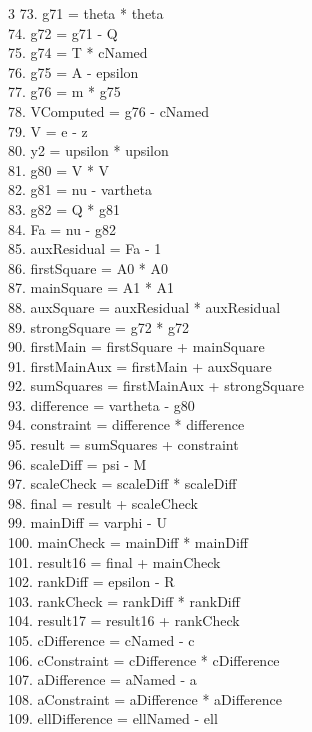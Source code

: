\documentclass[10pt]{article}
\begin{document}
\begin{multicols}{3}
73. g71 = theta * theta\\
74. g72 = g71 - Q\\
75. g74 = T * cNamed\\
76. g75 = A - epsilon\\
77. g76 = m * g75\\
78. VComputed = g76 - cNamed\\
79. V = e - z\\
80. y2 = upsilon * upsilon\\
81. g80 = V * V\\
82. g81 = nu - vartheta\\
83. g82 = Q * g81\\
84. Fa = nu - g82\\
85. auxResidual = Fa - 1\\
86. firstSquare = A0 * A0\\
87. mainSquare = A1 * A1\\
88. auxSquare = auxResidual * auxResidual\\
89. strongSquare = g72 * g72\\
90. firstMain = firstSquare + mainSquare\\
91. firstMainAux = firstMain + auxSquare\\
92. sumSquares = firstMainAux + strongSquare\\
93. difference = vartheta - g80\\
94. constraint = difference * difference\\
95. result = sumSquares + constraint\\
96. scaleDiff = psi - M\\
97. scaleCheck = scaleDiff * scaleDiff\\
98. final = result + scaleCheck\\
99. mainDiff = varphi - U\\
100. mainCheck = mainDiff * mainDiff\\
101. result16 = final + mainCheck\\
102. rankDiff = epsilon - R\\
103. rankCheck = rankDiff * rankDiff\\
104. result17 = result16 + rankCheck\\
105. cDifference = cNamed - c\\
106. cConstraint = cDifference * cDifference\\
107. aDifference = aNamed - a\\
108. aConstraint = aDifference * aDifference\\
109. ellDifference = ellNamed - ell\\

\end{multicols}
\end{document}

